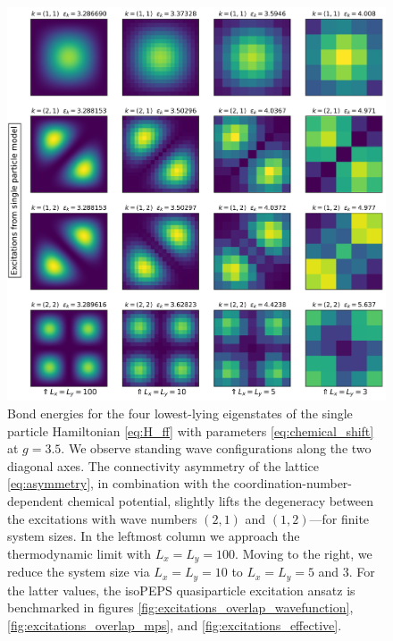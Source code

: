 \newpage
\begin{figure}[H]
  \centering
  \includegraphics[width=\linewidth]{excitations_3.5_single_particle.png}
  \caption{Bond energies for the four lowest-lying eigenstates of the single particle Hamiltonian \eqref{eq:H_ff} with parameters \eqref{eq:chemical_shift} at $g = 3.5$. We observe standing wave configurations along the two diagonal axes. The connectivity asymmetry of the lattice \eqref{eq:asymmetry}, in combination with the coordination-number-dependent chemical potential, slightly lifts the degeneracy between the excitations with wave numbers $(2, 1)$ and $(1, 2)$---for finite system sizes. In the leftmost column we approach the thermodynamic limit with $L_x = L_y = 100$. Moving to the right, we reduce the system size via $L_x = L_y = 10$ to $L_x = L_y = 5$ and $3$. For the latter values, the isoPEPS quasiparticle excitation ansatz is benchmarked in figures \ref{fig:excitations_overlap_wavefunction}, \ref{fig:excitations_overlap_mps}, and \ref{fig:excitations_effective}.}
 \label{fig:single_particle}
\end{figure}

